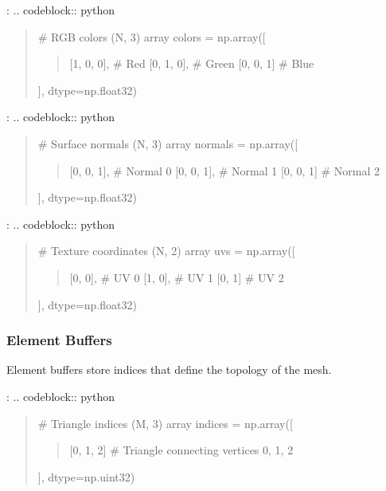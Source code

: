 \documentclass[a4paper,10pt,english,openany,oneside]{sphinxmanual}
\begin{document}
\sphinxAtStartPar
{}:
.. code\sphinxhyphen{}block:: python
\begin{quote}

\sphinxAtStartPar
\# RGB colors (N, 3) array
colors = np.array({[}
\begin{quote}

\sphinxAtStartPar
{[}1, 0, 0{]},  \# Red
{[}0, 1, 0{]},  \# Green
{[}0, 0, 1{]}   \# Blue
\end{quote}

\sphinxAtStartPar
{]}, dtype=np.float32)
\end{quote}

\sphinxAtStartPar
{}:
.. code\sphinxhyphen{}block:: python
\begin{quote}

\sphinxAtStartPar
\# Surface normals (N, 3) array
normals = np.array({[}
\begin{quote}

\sphinxAtStartPar
{[}0, 0, 1{]},  \# Normal 0
{[}0, 0, 1{]},  \# Normal 1
{[}0, 0, 1{]}   \# Normal 2
\end{quote}

\sphinxAtStartPar
{]}, dtype=np.float32)
\end{quote}

\sphinxAtStartPar
{}:
.. code\sphinxhyphen{}block:: python
\begin{quote}

\sphinxAtStartPar
\# Texture coordinates (N, 2) array
uvs = np.array({[}
\begin{quote}

\sphinxAtStartPar
{[}0, 0{]},  \# UV 0
{[}1, 0{]},  \# UV 1
{[}0, 1{]}   \# UV 2
\end{quote}

\sphinxAtStartPar
{]}, dtype=np.float32)
\end{quote}


\subsubsection{Element Buffers}
\label{\detokenize{api/buffers:element-buffers}}
\sphinxAtStartPar
Element buffers store indices that define the topology of the mesh.

\sphinxAtStartPar
{}:
.. code\sphinxhyphen{}block:: python
\begin{quote}

\sphinxAtStartPar
\# Triangle indices (M, 3) array
indices = np.array({[}
\begin{quote}

\sphinxAtStartPar
{[}0, 1, 2{]}  \# Triangle connecting vertices 0, 1, 2
\end{quote}

\sphinxAtStartPar
{]}, dtype=np.uint32)
\end{quote}
\end{document}
